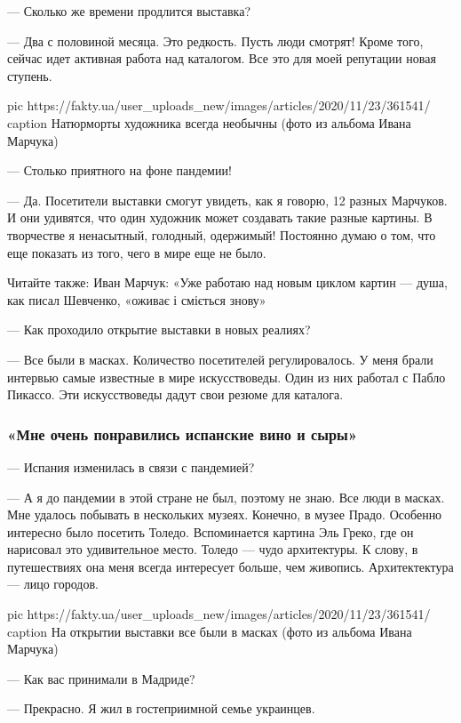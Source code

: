 — Сколько же времени продлится выставка?

— Два с половиной месяца. Это редкость. Пусть люди смотрят! Кроме того,
сейчас идет активная работа над каталогом. Все это для моей репутации
новая ступень.

\ifcmt
pic https://fakty.ua/user_uploads_new/images/articles/2020/11/23/361541/%
caption Натюрморты художника всегда необычны (фото из альбома Ивана Марчука)
\fi


— Столько приятного на фоне пандемии!

— Да. Посетители выставки смогут увидеть, как я говорю, 12 разных
Марчуков. И они удивятся, что один художник может создавать такие разные
картины. В творчестве я ненасытный, голодный, одержимый! Постоянно думаю
о том, что еще показать из того, чего в мире еще не было.

Читайте также: Иван Марчук: «Уже работаю над новым циклом картин — душа,
как писал Шевченко, «оживає і сміється знову»

— Как проходило открытие выставки в новых реалиях?

— Все были в масках. Количество посетителей регулировалось. У меня брали
интервью самые известные в мире искусствоведы. Один из них работал с Пабло
Пикассо. Эти искусствоведы дадут свои резюме для каталога.

\subsubsection{«Мне очень понравились испанские вино и сыры»}

— Испания изменилась в связи с пандемией?

— А я до пандемии в этой стране не был, поэтому не знаю. Все люди
в масках. Мне удалось побывать в нескольких музеях. Конечно, в музее
Прадо. Особенно интересно было посетить Толедо. Вспоминается картина Эль
Греко, где он нарисовал это удивительное место. Толедо — чудо архитектуры.
К слову, в путешествиях она меня всегда интересует больше, чем живопись.
Архитектектура — лицо городов.

\ifcmt
pic https://fakty.ua/user_uploads_new/images/articles/2020/11/23/361541/%
caption На открытии выставки все были в масках (фото из альбома Ивана Марчука)
\fi


— Как вас принимали в Мадриде?

— Прекрасно. Я жил в гостеприимной семье украинцев.

